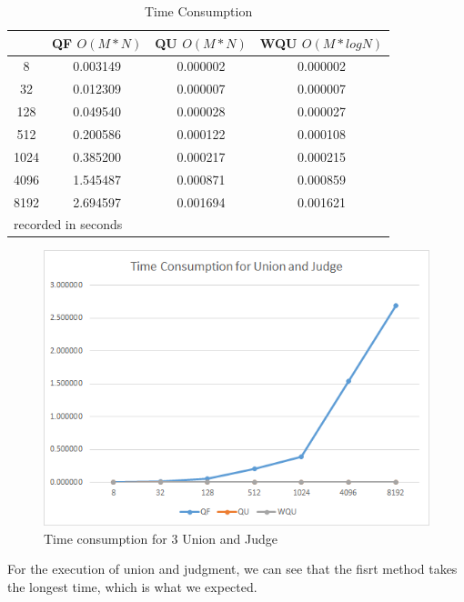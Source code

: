 \documentclass[conference]{IEEEtran}
\begin{document}
\begin{table}[H]
    \caption{Time Consumption}
    \begin{center}
        \begin{tabular}{|c|c|c|c|}
            \hline
             & QF $O(M*N)$ & QU $O(M*N)$ & WQU $O(M*logN)$\\
            \hline
            8	&0.003149&	0.000002&	0.000002\\
            \hline
            32	&0.012309&	0.000007&	0.000007\\
            \hline
            128	&0.049540&	0.000028&	0.000027\\
            \hline
            512	&0.200586&	0.000122&	0.000108\\
            \hline
            1024&	0.385200&	0.000217&	0.000215\\
            \hline
            4096&	1.545487&	0.000871&	0.000859\\
            \hline
            8192&	2.694597&	0.001694&	0.001621\\
            \hline
            \multicolumn{3}{l}{recorded in seconds}\\
        \end{tabular}
    \end{center}
\end{table}

\begin{figure}[H]
    \centerline{\includegraphics[scale=0.5]{Pic/fig2.png}}
    \caption{Time consumption for 3 Union and Judge}
\end{figure}

For the execution of union and judgment, we can see that the fisrt method
takes the longest time, which is what we expected. 
\end{document}
